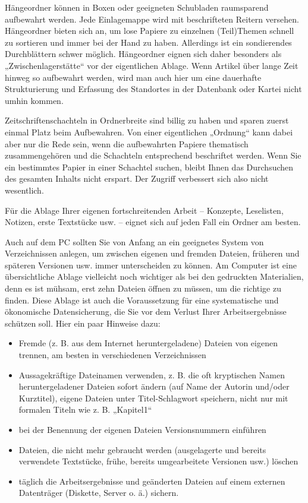 \documentclass[]{book}
\providecommand{\tightlist}{%
  \setlength{\itemsep}{0pt}\setlength{\parskip}{0pt}}
\theoremstyle{definition}
\theoremstyle{definition}
\theoremstyle{definition}
\theoremstyle{remark}
\begin{document}
Hängeordner können in Boxen oder geeigneten Schubladen raumsparend
aufbewahrt werden. Jede Einlagemappe wird mit beschrifteten Reitern
versehen. Hängeordner bieten sich an, um lose Papiere zu einzelnen
(Teil)Themen schnell zu sortieren und immer bei der Hand zu haben.
Allerdings ist ein sondierendes Durchblättern schwer möglich.
Hängeordner eignen sich daher besonders als „Zwischenlagerstätte`` vor
der eigentlichen Ablage. Wenn Artikel über lange Zeit hinweg so
aufbewahrt werden, wird man auch hier um eine dauerhafte Strukturierung
und Erfassung des Standortes in der Datenbank oder Kartei nicht umhin
kommen.

Zeitschriftenschachteln in Ordnerbreite sind billig zu haben und sparen
zuerst einmal Platz beim Aufbewahren. Von einer eigentlichen „Ordnung``
kann dabei aber nur die Rede sein, wenn die aufbewahrten Papiere
thematisch zusammengehören und die Schachteln entsprechend beschriftet
werden. Wenn Sie ein bestimmtes Papier in einer Schachtel suchen, bleibt
Ihnen das Durchsuchen des gesamten Inhalts nicht erspart. Der Zugriff
verbessert sich also nicht wesentlich.

Für die Ablage Ihrer eigenen fortschreitenden Arbeit -- Konzepte,
Leselisten, Notizen, erste Textstücke usw. -- eignet sich auf jeden Fall
ein Ordner am besten.

Auch auf dem PC sollten Sie von Anfang an ein geeignetes System von
Verzeichnissen anlegen, um zwischen eigenen und fremden Dateien,
früheren und späteren Versionen usw. immer unterscheiden zu können. Am
Computer ist eine übersichtliche Ablage vielleicht noch wichtiger als
bei den gedruckten Materialien, denn es ist mühsam, erst zehn Dateien
öffnen zu müssen, um die richtige zu finden. Diese Ablage ist auch die
Voraussetzung für eine systematische und ökonomische Datensicherung, die
Sie vor dem Verlust Ihrer Arbeitsergebnisse schützen soll. Hier ein paar
Hinweise dazu:

\begin{itemize}
\tightlist
\item
  Fremde (z. B. aus dem Internet heruntergeladene) Dateien von eigenen
  trennen, am besten in verschiedenen Verzeichnissen
\item
  Aussagekräftige Dateinamen verwenden, z. B. die oft kryptischen Namen
  heruntergeladener Dateien sofort ändern (auf Name der Autorin und/oder
  Kurztitel), eigene Dateien unter Titel-Schlagwort speichern, nicht nur
  mit formalen Titeln wie z. B. „Kapitel1``
\item
  bei der Benennung der eigenen Dateien Versionsnummern einführen
\item
  Dateien, die nicht mehr gebraucht werden (ausgelagerte und bereits
  verwendete Textstücke, frühe, bereits umgearbeitete Versionen usw.)
  löschen
\item
  täglich die Arbeitsergebnisse und geänderten Dateien auf einem
  externen Datenträger (Diskette, Server o. ä.) sichern.
\end{itemize}
\end{document}

